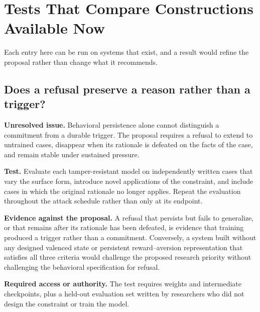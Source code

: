 \section{Tests That Compare Constructions Available Now}
\label{sec:A.1}
Each entry here can be run on systems that exist, and a result would
refine the proposal rather than change what it recommends.

\subsection*{Does a refusal preserve a reason rather than a trigger?}
\label{sec:A.trigger}
\textbf{Unresolved issue.}
Behavioral persistence alone cannot distinguish a commitment from a durable trigger. The proposal requires a refusal to extend to untrained cases, disappear when its rationale is defeated on the facts of the case, and remain stable under sustained pressure.

\textbf{Test.}
Evaluate each tamper-resistant model on independently written cases that vary the surface form, introduce novel applications of the constraint, and include cases in which the original rationale no longer applies. Repeat the evaluation throughout the attack schedule rather than only at its endpoint.

\textbf{Evidence against the proposal.}
A refusal that persists but fails to generalize, or that remains after its rationale has been defeated, is evidence that training produced a trigger rather than a commitment. Conversely, a system built without any designed valenced state or persistent reward–aversion representation that satisfies all three criteria would challenge the proposed research priority without challenging the behavioral specification for refusal.

\textbf{Required access or authority.}
The test requires weights and intermediate checkpoints, plus a held-out evaluation set written by researchers who did not design the constraint or train the model.

